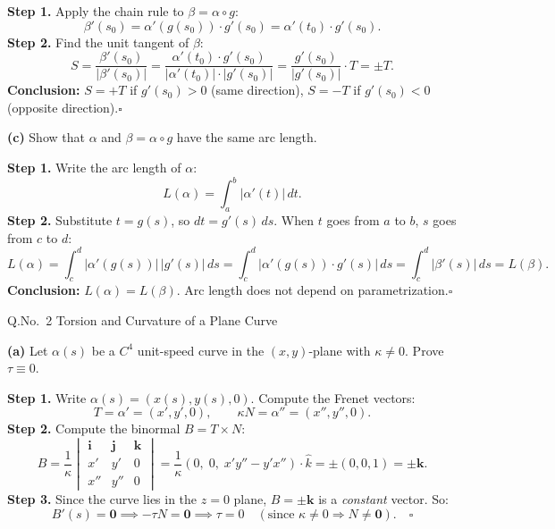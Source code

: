 \documentclass[12pt]{article}
\begin{document}
\begin{ansbox}
\textbf{Step 1.} Apply the chain rule to $\beta=\alpha\circ g$:
\[
  \beta'(s_0)=\alpha'(g(s_0))\cdot g'(s_0)=\alpha'(t_0)\cdot g'(s_0).
\]
\textbf{Step 2.} Find the unit tangent of $\beta$:
\[
  S=\frac{\beta'(s_0)}{|\beta'(s_0)|}=\frac{\alpha'(t_0)\cdot g'(s_0)}{|\alpha'(t_0)|\cdot|g'(s_0)|}=\frac{g'(s_0)}{|g'(s_0)|}\cdot T = \pm T.
\]
\textbf{Conclusion:} $S=+T$ if $g'(s_0)>0$ (same direction), $S=-T$ if $g'(s_0)<0$ (opposite direction).\hfill$\square$
\end{ansbox}

\vspace{10pt}
\textbf{(c)} Show that $\alpha$ and $\beta=\alpha\circ g$ have the same arc length.

\begin{ansbox}
\textbf{Step 1.} Write the arc length of $\alpha$:
\[
  L(\alpha)=\int_a^b|\alpha'(t)|\,dt.
\]
\textbf{Step 2.} Substitute $t=g(s)$, so $dt=g'(s)\,ds$. When $t$ goes from $a$ to $b$, $s$ goes from $c$ to $d$:
\[
  L(\alpha)=\int_c^d|\alpha'(g(s))|\,|g'(s)|\,ds=\int_c^d|\alpha'(g(s))\cdot g'(s)|\,ds=\int_c^d|\beta'(s)|\,ds=L(\beta).
\]
\textbf{Conclusion:} $L(\alpha)=L(\beta)$. Arc length does not depend on parametrization.\hfill$\square$
\end{ansbox}

\vspace{14pt}

\begin{qbox}{Q.No.\ 2}
Torsion and Curvature of a Plane Curve
\end{qbox}

\vspace{6pt}
\textbf{(a)} Let $\alpha(s)$ be a $C^4$ unit-speed curve in the $(x,y)$-plane with $\kappa\neq0$. Prove $\tau\equiv0$.

\begin{ansbox}
\textbf{Step 1.} Write $\alpha(s)=(x(s),y(s),0)$. Compute the Frenet vectors:
\[
  T=\alpha'=(x',y',0), \qquad \kappa N=\alpha''=(x'',y'',0).
\]
\textbf{Step 2.} Compute the binormal $B=T\times N$:
\[
  B=\frac{1}{\kappa}\begin{vmatrix}\mathbf{i}&\mathbf{j}&\mathbf{k}\\x'&y'&0\\x''&y''&0\end{vmatrix}
  =\frac{1}{\kappa}(0,\;0,\;x'y''-y'x'')\cdot\hat{k}=\pm(0,0,1)=\pm\mathbf{k}.
\]
\textbf{Step 3.} Since the curve lies in the $z=0$ plane, $B=\pm\mathbf{k}$ is a \emph{constant} vector. So:
\[
  B'(s)=\mathbf{0} \implies -\tau N=\mathbf{0} \implies \tau=0 \quad(\text{since }\kappa\neq0\Rightarrow N\neq\mathbf{0}).\quad\square
\]
\end{ansbox}
\end{document}
